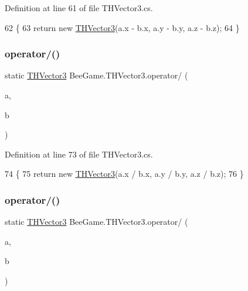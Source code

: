 Definition at line 61 of file T\+H\+Vector3.\+cs.


\begin{DoxyCode}
62         \{
63             \textcolor{keywordflow}{return} \textcolor{keyword}{new} \hyperlink{struct_bee_game_1_1_t_h_vector3_ad1b3467b019ea95fc114536aab566fb4}{THVector3}(a.x - b.x, a.y - b.y, a.z - b.z);
64         \}
\end{DoxyCode}
\mbox{\label{struct_bee_game_1_1_t_h_vector3_a465cd9dbaa1888ead6ea805852847e25}} 
\subsubsection{\texorpdfstring{operator/()}{operator/()}\hspace{0.1cm}{\footnotesize\ttfamily [1/2]}}
{\footnotesize\ttfamily static \hyperlink{struct_bee_game_1_1_t_h_vector3}{T\+H\+Vector3} Bee\+Game.\+T\+H\+Vector3.\+operator/ (\begin{DoxyParamCaption}\item[{\hyperlink{struct_bee_game_1_1_t_h_vector3}{T\+H\+Vector3}}]{a,  }\item[{\hyperlink{struct_bee_game_1_1_t_h_vector3}{T\+H\+Vector3}}]{b }\end{DoxyParamCaption})\hspace{0.3cm}{\ttfamily [static]}}



Definition at line 73 of file T\+H\+Vector3.\+cs.


\begin{DoxyCode}
74         \{
75             \textcolor{keywordflow}{return} \textcolor{keyword}{new} \hyperlink{struct_bee_game_1_1_t_h_vector3_ad1b3467b019ea95fc114536aab566fb4}{THVector3}(a.x / b.x, a.y / b.y, a.z / b.z);
76         \}
\end{DoxyCode}
\mbox{\label{struct_bee_game_1_1_t_h_vector3_a20da6def0da94e1266e1b3ee56d2f299}} 
\subsubsection{\texorpdfstring{operator/()}{operator/()}\hspace{0.1cm}{\footnotesize\ttfamily [2/2]}}
{\footnotesize\ttfamily static \hyperlink{struct_bee_game_1_1_t_h_vector3}{T\+H\+Vector3} Bee\+Game.\+T\+H\+Vector3.\+operator/ (\begin{DoxyParamCaption}\item[{\hyperlink{struct_bee_game_1_1_t_h_vector3}{T\+H\+Vector3}}]{a,  }\item[{float}]{b }\end{DoxyParamCaption})\hspace{0.3cm}{\ttfamily [static]}}




